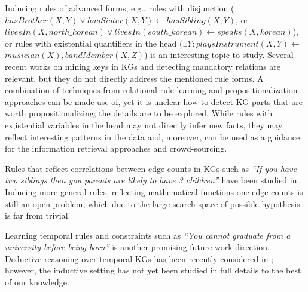 Inducing rules of  advanced forms, e.g., %
rules with disjunction (\eg $hasBrother(X,Y) \vee hasSister(X,Y) \leftarrow hasSibling(X,Y)$, or $livesIn(X, north\_korean) \vee livesIn(south\_korean) \leftarrow speaks(X, korean) $), or rules with existential quantifiers in the head (\eg $\exists Y: playsInstrument(X, Y) \leftarrow$ $musician(X),bandMember(X,Z)$) is an interesting topic to study. Several recent works on mining keys in KGs \cite{vickey,DBLP:conf/www/LajusS18} and detecting mandatory relations are relevant, but they do not directly address the mentioned rule forms. A combination of techniques from relational rule learning \cite{DBLP:books/daglib/0021868} and propositionalization approaches \cite{propos} can be made use of, yet it is unclear how to detect KG parts that are worth propositionalizing; the details are to be explored. %
While rules with ex,istential variables in the head may not directly infer new facts, they may reflect interesting patterns in the data and, moreover, can be used as a guidance for the information retrieval approaches and crowd-sourcing.

Rules that reflect correlations between edge counts in KGs such as \emph{``If you have two siblings then you parents are likely to have 3 children''} have been studied in \cite{carl}. Inducing more general rules, reflecting mathematical functions one edge counts is still an open problem, which due to the large search space of possible hypothesis is far from trivial.

Learning temporal rules and constraints such as \emph{``You cannot graduate from a university before being born''} is another promising future work direction. Deductive reasoning over temporal KGs has been recently considered in \cite{DBLP:conf/aaai/ChekolPSS17}; however, the inductive setting has not yet been studied in full details to the best of our knowledge.

